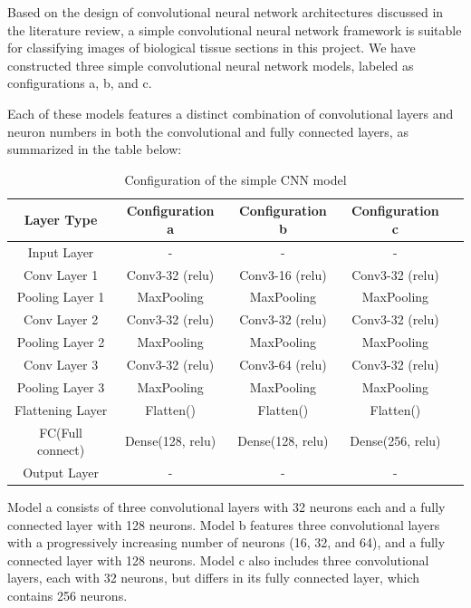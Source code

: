 Based on the design of convolutional neural network architectures discussed in the literature review, a simple convolutional neural network framework is suitable for classifying images of biological tissue sections in this project. We have constructed three simple convolutional neural network models, labeled as configurations a, b, and c.

Each of these models features a distinct combination of convolutional layers and neuron numbers in both the convolutional and fully connected layers, as summarized in the table below:

\begin{table}[H]
    \centering
    \caption{Configuration of the simple CNN model}
    \begin{tabular}{ccccc}
        \toprule
        \textbf{Layer Type} & \textbf{Configuration a} & \textbf{Configuration b} & \textbf{Configuration c} \\
        \midrule
        Input Layer & - & - & - \\
        Conv Layer 1 & Conv3-32 (relu) & Conv3-16 (relu) & Conv3-32 (relu) \\
        Pooling Layer 1 & MaxPooling & MaxPooling& MaxPooling \\
        Conv Layer 2 & Conv3-32 (relu) & Conv3-32 (relu) & Conv3-32 (relu) \\
        Pooling Layer 2 & MaxPooling & MaxPooling& MaxPooling \\
        Conv Layer 3 & Conv3-32 (relu) & Conv3-64 (relu) & Conv3-32 (relu) \\
        Pooling Layer 3 & MaxPooling & MaxPooling& MaxPooling \\
        Flattening Layer & Flatten() & Flatten() & Flatten() \\
        FC(Full connect) & Dense(128, relu) & Dense(128, relu) & Dense(256, relu) \\
        Output Layer & - & - & - \\
        \bottomrule
    \end{tabular}
    \label{tab:cnn_simple_configuration}
    \end{table}

Model a consists of three convolutional layers with 32 neurons each and a fully connected layer with 128 neurons. Model b features three convolutional layers with a progressively increasing number of neurons (16, 32, and 64), and a fully connected layer with 128 neurons. Model c also includes three convolutional layers, each with 32 neurons, but differs in its fully connected layer, which contains 256 neurons.

